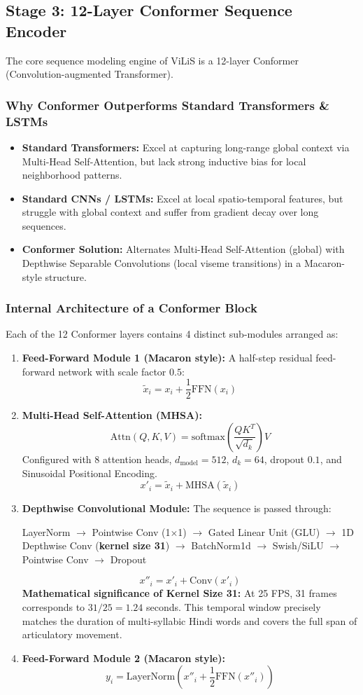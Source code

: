 \documentclass[11pt,a4paper]{article}
\begin{document}
\subsection{Stage 3: 12-Layer Conformer Sequence Encoder}
The core sequence modeling engine of ViLiS is a 12-layer Conformer (Convolution-augmented Transformer).
\subsubsection{Why Conformer Outperforms Standard Transformers \& LSTMs}
\begin{itemize}
    \item \textbf{Standard Transformers:} Excel at capturing long-range global context via Multi-Head Self-Attention, but lack strong inductive bias for local neighborhood patterns.
    \item \textbf{Standard CNNs / LSTMs:} Excel at local spatio-temporal features, but struggle with global context and suffer from gradient decay over long sequences.
    \item \textbf{Conformer Solution:} Alternates Multi-Head Self-Attention (global) with Depthwise Separable Convolutions (local viseme transitions) in a Macaron-style structure.
\end{itemize}

\subsubsection{Internal Architecture of a Conformer Block}
Each of the 12 Conformer layers contains 4 distinct sub-modules arranged as:
\begin{enumerate}
    \item \textbf{Feed-Forward Module 1 (Macaron style):} A half-step residual feed-forward network with scale factor $0.5$:
    $$\tilde{x}_i = x_i + \frac{1}{2} \text{FFN}(x_i)$$
    \item \textbf{Multi-Head Self-Attention (MHSA):}
    $$\text{Attn}(Q, K, V) = \text{softmax}\left(\frac{QK^T}{\sqrt{d_k}}\right)V$$
    Configured with 8 attention heads, $d_{\text{model}} = 512$, $d_k = 64$, dropout $0.1$, and Sinusoidal Positional Encoding.
    $$x'_i = \tilde{x}_i + \text{MHSA}(\tilde{x}_i)$$
    \item \textbf{Depthwise Convolutional Module:}
    The sequence is passed through:
    \begin{center}
    LayerNorm $\to$ Pointwise Conv (1$\times$1) $\to$ Gated Linear Unit (GLU) $\to$ 1D Depthwise Conv (\textbf{kernel size 31}) $\to$ BatchNorm1d $\to$ Swish/SiLU $\to$ Pointwise Conv $\to$ Dropout
    \end{center}
    $$x''_i = x'_i + \text{Conv}(x'_i)$$
    \textbf{Mathematical significance of Kernel Size 31:} At 25 FPS, 31 frames corresponds to $31 / 25 = 1.24$ seconds. This temporal window precisely matches the duration of multi-syllabic Hindi words and covers the full span of articulatory movement.
    \item \textbf{Feed-Forward Module 2 (Macaron style):}
    $$y_i = \text{LayerNorm}\left(x''_i + \frac{1}{2} \text{FFN}(x''_i)\right)$$
\end{enumerate}
\end{document}
